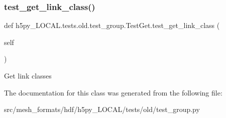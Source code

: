 \subsubsection{\texorpdfstring{test\+\_\+get\+\_\+link\+\_\+class()}{test\_get\_link\_class()}}
{\footnotesize\ttfamily def h5py\+\_\+\+L\+O\+C\+A\+L.\+tests.\+old.\+test\+\_\+group.\+Test\+Get.\+test\+\_\+get\+\_\+link\+\_\+class (\begin{DoxyParamCaption}\item[{}]{self }\end{DoxyParamCaption})}

\begin{DoxyVerb}Get link classes \end{DoxyVerb}
 

The documentation for this class was generated from the following file\+:\begin{DoxyCompactItemize}
\item 
src/mesh\+\_\+formats/hdf/h5py\+\_\+\+L\+O\+C\+A\+L/tests/old/test\+\_\+group.\+py\end{DoxyCompactItemize}
